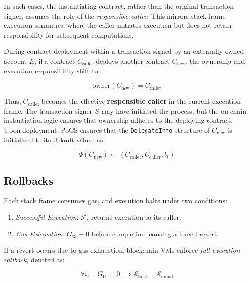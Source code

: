 \documentclass{article}
\begin{document}
In such cases, the instantiating contract, rather than the original transaction signer, assumes the role of the \textit{responsible caller}. This mirrors stack-frame execution semantics, where the caller initiates execution but does not retain responsibility for subsequent computations.
 
During contract deployment within a transaction signed by an externally owned account \( E \), if a contract \( C_{\text{caller}} \) deploys another contract \( C_{\text{new}} \), the ownership and execution responsibility shift to:

\begin{equation}
    \text{owner}(C_{\text{new}}) = C_{\text{caller}}
\end{equation}

Thus, \( C_{\text{caller}} \) becomes the effective \textbf{responsible caller} in the current execution frame. The transaction signer \( S \) may have initiated the process, but the on-chain instantiation logic ensures that ownership adheres to the deploying contract.
Upon deployment, PoCS ensures that the \texttt{DelegateInfo} structure of \( C_{\text{new}} \) is initialized to its default values as:

\begin{equation}
    \Psi(C_{\text{new}}) \gets (C_{\text{caller}}, C_{\text{caller}}, b_t)
\end{equation}

\subsection{Rollbacks}

Each stack frame consumes gas, and execution halts under two conditions:
\begin{enumerate}
    \item \textit{Successful Execution}: \( \mathcal{F}_i \) returns execution to its caller.
    \item \textit{Gas Exhaustion}: \( G_\text{tx} = 0 \) before completion, causing a forced revert.
\end{enumerate}

If a revert occurs due to gas exhaustion, blockchain VMs enforce \textit{full execution rollback}, denoted as:

\begin{equation}
\forall i, \quad G_\text{tx} = 0 \implies \mathcal{S}_{\text{final}} = \mathcal{S}_{\text{initial}}
\end{equation}
\end{document}
